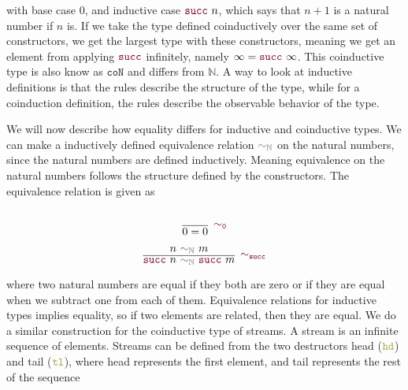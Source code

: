 \documentclass[twoside,11pt,openright]{report}
\theoremstyle{plain} %
\theoremstyle{definition}
\theoremstyle{remark}
\newcommand*{\relation}[1]{\textcolor{gray!75!black}{\ensuremath{\mathtt{#1}}}}
\newcommand*{\constructor}[1]{\textcolor{purple!60!black}{\ensuremath{\mathtt{#1}}}}
\newcommand*{\destructor}[1]{\textcolor{yellow!60!black}{\ensuremath{\mathtt{#1}}}}
\begin{document}
with base case 0, and inductive case \(\constructor{succ}~n\), which says that \(n+1\) is a natural number if \(n\) is. If we take the type defined coinductively over the same set of constructors, we get the largest type with these constructors, meaning we get an element from applying \(\constructor{succ}\) infinitely, namely \(\infty = \constructor{succ}~\infty\). This coinductive type is also know as \(\mathtt{co}\mathtt{N}\) and differs from \(\mathbb{N}\). A way to look at inductive definitions is that the rules describe the structure of the type, while for a coinduction definition, the rules describe the observable behavior of the type.

We will now describe how equality differs for inductive and coinductive types. We can make a inductively defined equivalence relation \(\relation{\sim_{\mathbb{N}}}\) on the natural numbers, since the natural numbers are defined inductively. Meaning equivalence on the natural numbers follows the structure defined by the constructors. The equivalence relation is given as \\[-10mm]
\begin{center}
  \strut
  \hfill
  \begin{minipage}{0.20\linewidth}
    \begin{equation}
      \vcenter{\infer[\constructor{\sim_{0}}]{0 = 0}{\strut}}
    \end{equation}
  \end{minipage}
  \hfill
  \begin{minipage}{0.35\linewidth}
    \begin{equation}
      \vcenter{\infer[\constructor{\sim_{succ}}]{\constructor{succ}~n~\relation{\sim_{\mathbb{N}}}~\constructor{succ}~m}{n~\relation{\sim_{\mathbb{N}}}~m}}
    \end{equation}
  \end{minipage}
  \hfill
  \strut
\end{center}
where two natural numbers are equal if they both are zero or if they are equal when we subtract one from each of them. Equivalence relations for inductive types implies equality, so if two elements are related, then they are equal. We do a similar construction for the coinductive type of streams. A stream is an infinite sequence of elements. Streams can be defined from the two destructors head (\(\destructor{hd}\)) and tail (\(\destructor{tl}\)), where head represents the first element, and tail represents the rest of the sequence\\[-10mm]
\end{document}
